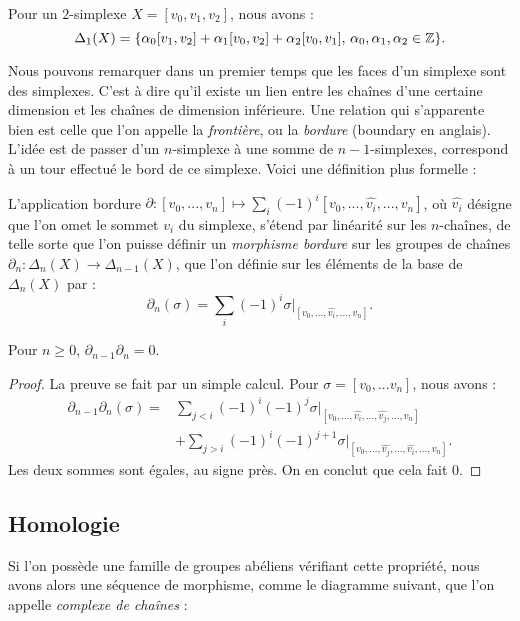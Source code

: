\begin{exemple}
Pour un $2$-simplexe $X=[v_0,v_1,v_2]$, nous avons :$$\Delta_1(X)=\{\alpha_0[v_1,v_2]+\alpha_1[v_0,v_2]+\alpha_2[v_0,v_1],\,\alpha_0,\alpha_1,\alpha_2\in\mathbb{Z}\}.$$
\end{exemple}

Nous pouvons remarquer dans un premier temps que les faces d'un simplexe sont des simplexes. C'est à dire qu'il existe un lien entre les chaînes d'une certaine dimension et les chaînes de dimension inférieure. Une relation qui s'apparente bien est celle que l'on appelle la \emph{frontière}, ou la \emph{bordure} (boundary en anglais). L'idée est de passer d'un $n$-simplexe à une somme de $n-1$-simplexes, correspond à un tour effectué le bord de ce simplexe. Voici une définition plus formelle :

\begin{definition}
L'application bordure $\partial:[v_0,...,v_n]\mapsto\sum_i(-1)^i[v_0,...,\hat{v_i},...,v_n]$, où $\hat{v_i}$ désigne que l'on omet le sommet $v_i$ du simplexe, s'étend par linéarité sur les $n$-chaînes, de telle sorte que l'on puisse définir un \emph{morphisme bordure} sur les groupes de chaînes $\partial_n:\Delta_n(X)\to\Delta_{n-1}(X)$, que l'on définie sur les éléments de la base de $\Delta_n(X)$ par : \[\partial_n(\sigma)=\sum_i(-1)^i\sigma|_{[v_0,...,\hat{v_i},...,v_n]}.\]
\end{definition}

\begin{proposition}
Pour $n\geq0$, $\partial_{n-1}\partial_n=0$.
\end{proposition}
\begin{proof}
La preuve se fait par un simple calcul. Pour $\sigma=[v_0,...v_n]$, nous avons : \[\begin{split}
\partial_{n-1}\partial_n(\sigma)=&\sum_{j<i}(-1)^i(-1)^j\sigma|_{[v_0,...,\hat{v_i},...,\hat{v_j},...,v_n]}\\
&+\sum_{j>i}(-1)^i(-1)^{j+1}\sigma|_{[v_0,...,\hat{v_j},...,\hat{v_i},...,v_n]}.
\end{split}\]Les deux sommes sont égales, au signe près. On en conclut que cela fait 0. 
\end{proof}


\subsection{Homologie}\label{sect:simpl-homology}

Si l'on possède une famille de groupes abéliens vérifiant cette propriété, nous avons alors une séquence de morphisme, comme le diagramme suivant, que l'on appelle \emph{complexe de chaînes} :


